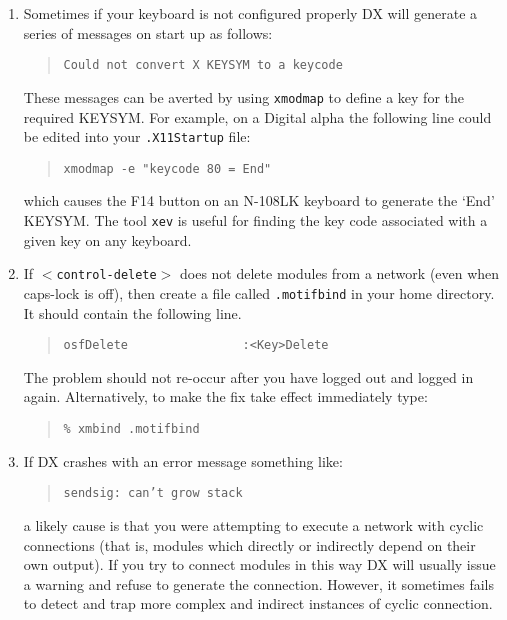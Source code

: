 \begin{enumerate}
  \begin{quote}
   {\tt ps aux | grep dx}
  \end{quote}

  \item Sometimes if your keyboard is not configured properly DX will
   generate a series of messages on start up as follows:

  \begin{quote}
   {\tt Could not convert X KEYSYM to a keycode}
  \end{quote}

   These messages can be averted by using {\tt xmodmap} to define a key
   for the required KEYSYM. For example, on a Digital alpha the following
   line could be edited into your {\tt .X11Startup} file:

  \begin{quote}
   {\tt xmodmap -e "keycode 80 = End"}
  \end{quote}

   which causes the F14 button on an N-108LK keyboard to generate the
   `End' KEYSYM. The tool {\tt xev} is useful for finding the key code
   associated with a given key on any keyboard.

  \item If {\tt $<$control-delete$>$} does not delete modules from a
   network (even when caps-lock is off), then create a file called
   {\tt .motifbind} in your home directory. It should contain the
   following line.

  \begin{quote}
   \verb-osfDelete                :<Key>Delete-
  \end{quote}

   The problem should not re-occur after you have logged out and
   logged in again.  Alternatively, to make the fix take effect
   immediately type:

  \begin{quote}
   {\tt \% xmbind .motifbind}
  \end{quote}

  \item If DX crashes with an error message something like:

  \begin{quote}
   {\tt sendsig: can't grow stack}
  \end{quote}

   a likely cause is that you were attempting to execute a network
   with cyclic connections (that is, modules which directly or
   indirectly depend on their own output). If you try to connect modules
   in this way DX will usually issue a warning and refuse to generate
   the connection. However, it sometimes fails to detect and trap
   more complex and indirect instances of cyclic connection.

\end{enumerate}


